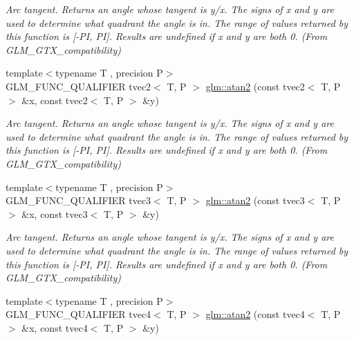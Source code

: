 \begin{DoxyCompactItemize}
\begin{DoxyCompactList}\small\item\em Arc tangent. Returns an angle whose tangent is y/x. The signs of x and y are used to determine what quadrant the angle is in. The range of values returned by this function is \mbox{[}-\/\-P\-I, P\-I\mbox{]}. Results are undefined if x and y are both 0. (From G\-L\-M\-\_\-\-G\-T\-X\-\_\-compatibility) \end{DoxyCompactList}\item 
\hypertarget{group__gtx__compatibility_ga525f3e849d0fc64807f8ab571b4545f9}{{\footnotesize template$<$typename T , precision P$>$ }\\G\-L\-M\-\_\-\-F\-U\-N\-C\-\_\-\-Q\-U\-A\-L\-I\-F\-I\-E\-R tvec2$<$ T, P $>$ \hyperlink{group__gtx__compatibility_ga525f3e849d0fc64807f8ab571b4545f9}{glm\-::atan2} (const tvec2$<$ T, P $>$ \&x, const tvec2$<$ T, P $>$ \&y)}\label{group__gtx__compatibility_ga525f3e849d0fc64807f8ab571b4545f9}

\begin{DoxyCompactList}\small\item\em Arc tangent. Returns an angle whose tangent is y/x. The signs of x and y are used to determine what quadrant the angle is in. The range of values returned by this function is \mbox{[}-\/\-P\-I, P\-I\mbox{]}. Results are undefined if x and y are both 0. (From G\-L\-M\-\_\-\-G\-T\-X\-\_\-compatibility) \end{DoxyCompactList}\item 
\hypertarget{group__gtx__compatibility_gad328042b6734d3f2c49c0ec1328b14c0}{{\footnotesize template$<$typename T , precision P$>$ }\\G\-L\-M\-\_\-\-F\-U\-N\-C\-\_\-\-Q\-U\-A\-L\-I\-F\-I\-E\-R tvec3$<$ T, P $>$ \hyperlink{group__gtx__compatibility_gad328042b6734d3f2c49c0ec1328b14c0}{glm\-::atan2} (const tvec3$<$ T, P $>$ \&x, const tvec3$<$ T, P $>$ \&y)}\label{group__gtx__compatibility_gad328042b6734d3f2c49c0ec1328b14c0}

\begin{DoxyCompactList}\small\item\em Arc tangent. Returns an angle whose tangent is y/x. The signs of x and y are used to determine what quadrant the angle is in. The range of values returned by this function is \mbox{[}-\/\-P\-I, P\-I\mbox{]}. Results are undefined if x and y are both 0. (From G\-L\-M\-\_\-\-G\-T\-X\-\_\-compatibility) \end{DoxyCompactList}\item 
\hypertarget{group__gtx__compatibility_ga09d39c391a509a045b6c7061f15bdff5}{{\footnotesize template$<$typename T , precision P$>$ }\\G\-L\-M\-\_\-\-F\-U\-N\-C\-\_\-\-Q\-U\-A\-L\-I\-F\-I\-E\-R tvec4$<$ T, P $>$ \hyperlink{group__gtx__compatibility_ga09d39c391a509a045b6c7061f15bdff5}{glm\-::atan2} (const tvec4$<$ T, P $>$ \&x, const tvec4$<$ T, P $>$ \&y)}\label{group__gtx__compatibility_ga09d39c391a509a045b6c7061f15bdff5}


\end{DoxyCompactItemize}
